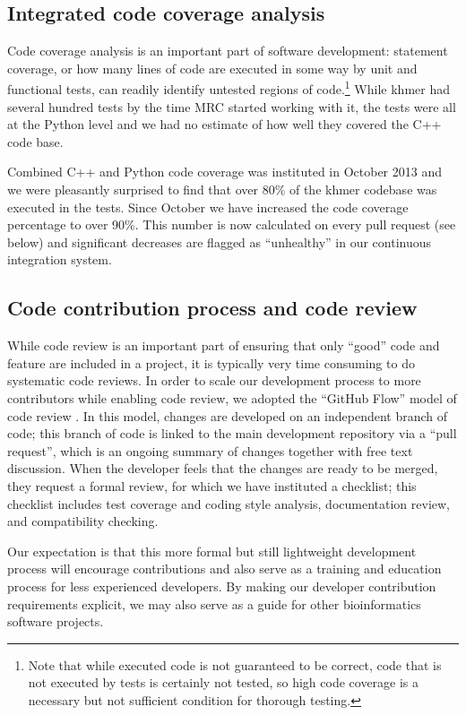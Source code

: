 \documentclass[12pt]{article}
\begin{document}

\subsection{Integrated code coverage analysis}

Code coverage analysis is an important part of software development:
statement coverage, or how many lines of code are executed in some way
by unit and functional tests, can readily identify untested regions of
code.\footnote{Note that while executed code is not guaranteed to be
  correct, code that is not executed by tests is certainly not tested,
  so high code coverage is a necessary but not sufficient condition
  for thorough testing.}  While khmer had several hundred tests by the
time MRC started working with it, the tests were all at the Python
level and we had no estimate of how well they covered the C++ code
base.

Combined C++ and Python code coverage was instituted in October 2013
and we were pleasantly surprised to find that over 80\% of the khmer
codebase was executed in the tests.  Since October we have increased
the code coverage percentage to over 90\%. This number is now
calculated on every pull request (see below) and significant decreases
are flagged as ``unhealthy'' in our continuous integration system.

\subsection{Code contribution process and code review}

While code review is an important part of ensuring that only ``good''
code and feature are included in a project, it is typically very time
consuming to do systematic code reviews.  In order to scale our
development process to more contributors while enabling code review,
we adopted the ``GitHub Flow'' model of code review \cite{GitHubFlow}.
In this model, changes are developed on an independent branch
of code; this branch of code is linked to the main development
repository via a ``pull request'', which is an ongoing summary of
changes together with free text discussion.  When the developer feels
that the changes are ready to be merged, they request a formal review,
for which we have instituted a checklist; this checklist includes test
coverage and coding style analysis, documentation review, and
compatibility checking.

Our expectation is that this more formal but still lightweight
development process will encourage contributions and also serve as a
training and education process for less experienced developers.  By
making our developer contribution requirements explicit, we may also
serve as a guide for other bioinformatics software projects.
\end{document}

